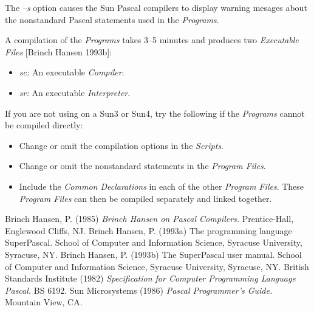 The {\it --s} option causes the Sun Pascal compilers to
display warning mesages about the nonstandard Pascal
statements used in the {\it Programs}.

A compilation of the {\it Programs} takes 3--5 minutes
and produces two {\it Executable Files} [Brinch Hansen
1993b]:

\begin{itemize}
  \item
  {\it sc:} An executable {\it Compiler}.
  \item
  {\it sr:} An executable {\it Interpreter}.
\end{itemize}

If you are not using {\Superpascal} on a Sun3 or Sun4, try
the following if the {\it Programs} cannot be compiled
directly:

\begin{itemize}
  \item
  Change or omit the compilation options in the {\it
  Scripts}.
  \item
  Change or omit the nonstandard statements in the
  {\it Program Files}.
  \item
  Include the {\it Common Declarations} in each of the
  other {\it Program Files}. These {\it Program Files}
  can then be compiled separately and linked together.
\end{itemize}


\begin{mybibliography}{5}
  \entry
  Brinch Hansen, P. (1985) {\it Brinch Hansen on Pascal
  Compilers.} Prentice-Hall, Englewood Cliffs, NJ.
  \entry
  Brinch Hansen, P. (1993a) The programming language
  SuperPascal. School of Computer and Information Science,
  Syracuse University, Syracuse, NY.
  \entry
  Brinch Hansen, P. (1993b) The SuperPascal user manual.
  School of Computer and Information Science, Syracuse
  University, Syracuse, NY.
  \entry
  British Standards Institute (1982) {\it Specification
  for Computer Programming Language Pascal.} BS 6192.
  \entry
  Sun Microsystems (1986) {\it Pascal Programmer's Guide.}
  Mountain View, CA.
\end{mybibliography}


